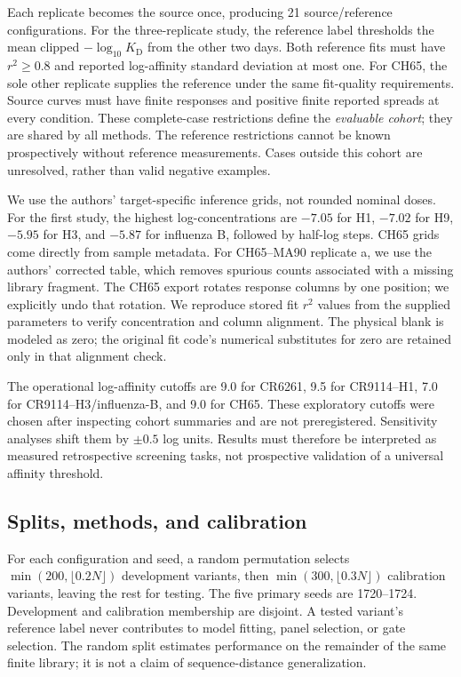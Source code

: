 \documentclass[11pt,letterpaper]{article}
\newcommand{\KD}{K_{\mathrm D}}
\begin{document}
Each replicate becomes the source once, producing 21 source/reference configurations. For the three-replicate study, the reference label thresholds the mean clipped $-\log_{10}\KD$ from the other two days. Both reference fits must have $r^2\geq0.8$ and reported log-affinity standard deviation at most one. For CH65, the sole other replicate supplies the reference under the same fit-quality requirements. Source curves must have finite responses and positive finite reported spreads at every condition. These complete-case restrictions define the \emph{evaluable cohort}; they are shared by all methods. The reference restrictions cannot be known prospectively without reference measurements. Cases outside this cohort are unresolved, rather than valid negative examples.

We use the authors' target-specific inference grids, not rounded nominal doses. For the first study, the highest log-concentrations are $-7.05$ for H1, $-7.02$ for H9, $-5.95$ for H3, and $-5.87$ for influenza B, followed by half-log steps. CH65 grids come directly from sample metadata. For CH65--MA90 replicate a, we use the authors' corrected table, which removes spurious counts associated with a missing library fragment. The CH65 export rotates response columns by one position; we explicitly undo that rotation. We reproduce stored fit $r^2$ values from the supplied parameters to verify concentration and column alignment. The physical blank is modeled as zero; the original fit code's numerical substitutes for zero are retained only in that alignment check.

The operational log-affinity cutoffs are 9.0 for CR6261, 9.5 for CR9114--H1, 7.0 for CR9114--H3/influenza-B, and 9.0 for CH65. These exploratory cutoffs were chosen after inspecting cohort summaries and are not preregistered. Sensitivity analyses shift them by $\pm0.5$ log units. Results must therefore be interpreted as measured retrospective screening tasks, not prospective validation of a universal affinity threshold.



\subsection{Splits, methods, and calibration}
For each configuration and seed, a random permutation selects $\min(200,\lfloor0.2N\rfloor)$ development variants, then $\min(300,\lfloor0.3N\rfloor)$ calibration variants, leaving the rest for testing. The five primary seeds are 1720--1724. Development and calibration membership are disjoint. A tested variant's reference label never contributes to model fitting, panel selection, or gate selection. The random split estimates performance on the remainder of the same finite library; it is not a claim of sequence-distance generalization.
\end{document}
